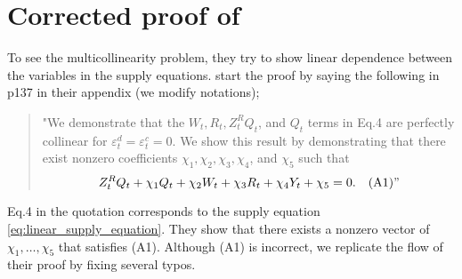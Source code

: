 \documentclass[11pt, a4paper]{article}
\begin{document}



\newpage
\appendix

\section{Corrected proof of \cite{perloff2012collinearity}}\label{sec:corrected_proof_of_PS}

To see the multicollinearity problem, they try to show linear dependence between the variables in the supply equations. 
\cite{perloff2012collinearity} start the proof by saying the following in p137 in their appendix (we modify notations);
\begin{quote}
    "We demonstrate that the $W_{t}, R_{t}, Z^{R}_{t}Q_{t}$, and $Q_{t}$ terms in Eq.4 are perfectly collinear for $\varepsilon_{t}^{d} = \varepsilon_{t}^{c} = 0$. We show this result by demonstrating that there exist nonzero coefficients $\chi_1,\chi_2,\chi_3,\chi_4$, and $\chi_5$ such that 
    \[Z^{R}_{t} Q_{t} + \chi_1 Q_{t} + \chi_2 W_{t} + \chi_3 R_{t} + \chi_4 Y_{t} + \chi_5 = 0.\quad \text{(A1)}"\]
\end{quote}
Eq.4 in the quotation corresponds to the supply equation \eqref{eq:linear_supply_equation}.
They show that there exists a nonzero vector of $\chi_1, \ldots, \chi_5$ that satisfies (A1). 
Although (A1) is incorrect, we replicate the flow of their proof by fixing several typos.
\end{document}
